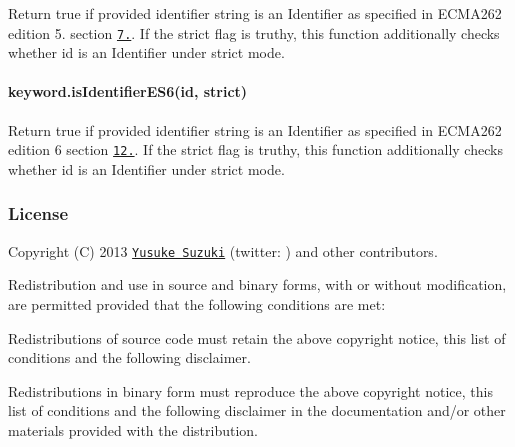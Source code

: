 Return true if provided identifier string is an Identifier as specified in E\+C\+M\+A262 edition 5. section \href{https://es5.github.io/#x7.6}{\tt 7.}. If the {\ttfamily strict} flag is truthy, this function additionally checks whether {\ttfamily id} is an Identifier under strict mode.

\paragraph*{keyword.\+is\+Identifier\+E\+S6(id, strict)}

Return true if provided identifier string is an Identifier as specified in E\+C\+M\+A262 edition 6 section \href{https://people.mozilla.org/~jorendorff/es6-draft.html#sec-identifiers}{\tt 12.}. If the {\ttfamily strict} flag is truthy, this function additionally checks whether {\ttfamily id} is an Identifier under strict mode.

\subsubsection*{License}

Copyright (C) 2013 \href{http://github.com/Constellation}{\tt Yusuke Suzuki} (twitter\+: \href{http://twitter.com/Constellation}{\tt }) and other contributors.

Redistribution and use in source and binary forms, with or without modification, are permitted provided that the following conditions are met\+:


\begin{DoxyItemize}
\item Redistributions of source code must retain the above copyright notice, this list of conditions and the following disclaimer.
\item Redistributions in binary form must reproduce the above copyright notice, this list of conditions and the following disclaimer in the documentation and/or other materials provided with the distribution.
\end{DoxyItemize}

